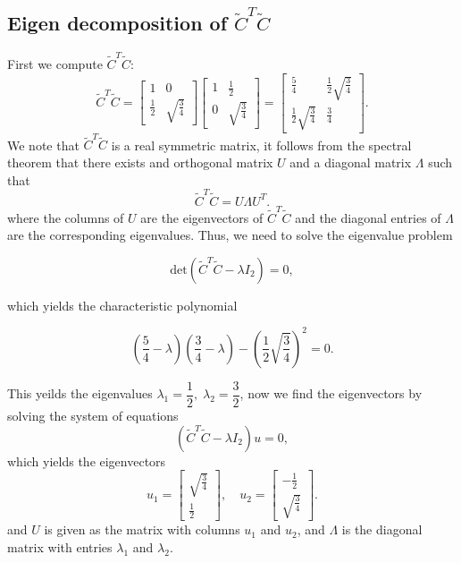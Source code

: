 \documentclass{article}
\begin{document}
\subsection{Eigen decomposition of $\tilde{C}^T\tilde{C}$}

First we compute $\tilde{C}^T\tilde{C}$:
\begin{equation*}
    \tilde{C}^T\tilde{C} = \begin{bmatrix}
        1 & 0\\
        \frac{1}{2} & \sqrt{\frac{3}{4}}
    \end{bmatrix} \begin{bmatrix}
        1 & \frac{1}{2}\\
        0 & \sqrt{\frac{3}{4}}
    \end{bmatrix} = \begin{bmatrix}
        \frac{5}{4} & \frac{1}{2}\sqrt{\frac{3}{4}}\\
        \frac{1}{2}\sqrt{\frac{3}{4}} & \frac{3}{4}
    \end{bmatrix}.
\end{equation*}
We note that $\tilde{C}^T\tilde{C}$ is a real symmetric matrix, it follows from the spectral theorem that there exists and orthogonal matrix $U$ and a diagonal matrix $\Lambda$ such that
\begin{equation}
    \tilde{C}^T\tilde{C} = U\Lambda U^T.
    \label{eq:eigendecomp}
\end{equation}
where the columns of $U$ are the eigenvectors of $\tilde{C}^T\tilde{C}$ and the diagonal entries of $\Lambda$ are the corresponding eigenvalues. Thus, we need to solve the eigenvalue problem

\begin{equation*}
    \text{det}(\tilde{C}^T\tilde{C} - \lambda I_2) = 0,
\end{equation*}

which yields the characteristic polynomial

\begin{equation*}
    \left(\frac{5}{4} - \lambda\right)\left(\frac{3}{4} - \lambda\right) - \left(\frac{1}{2}\sqrt{\frac{3}{4}}\right)^2 = 0.
\end{equation*}

This yeilds the eigenvalues $\lambda_1 = \dfrac{1}{2}, \; \lambda_2 = \dfrac{3}{2}$, now we find the eigenvectors by solving the system of equations
\begin{equation*}
    (\tilde{C}^T\tilde{C} - \lambda I_2)u = 0,
\end{equation*}
which yields the eigenvectors
\begin{equation*}
    u_1 = \begin{bmatrix} \sqrt{\frac{3}{4}} \\ \frac{1}{2} \end{bmatrix}, \quad u_2 = \begin{bmatrix} -\frac{1}{2} \\ \sqrt{\frac{3}{4}}  \end{bmatrix}.
\end{equation*}
and $U$ is given as the matrix with columns $u_1$ and $u_2$, and $\Lambda$ is the diagonal matrix with entries $\lambda_1$ and $\lambda_2$.
\end{document}
